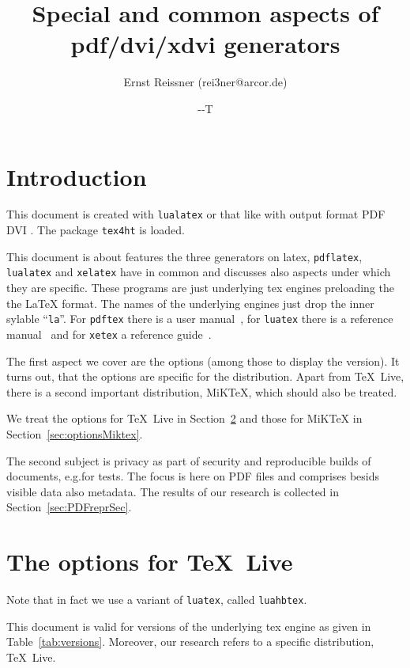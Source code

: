 \documentclass[a4paper, english]{article}%
\title{Special and common aspects of pdf/dvi/xdvi generators }
\author{Ernst Reissner (rei3ner@arcor.de)}
\date{\the\year-\the\month-\the\day T\printtime}%
\newcommand{\pdflatex}{\texttt{pdflatex}}
\newcommand{\lualatex}{\texttt{lualatex}}
\newcommand{\xelatex}{\texttt{xelatex}}
\newcommand{\texlive}{\TeX~Live}
\newcommand{\miktex}{MiKTeX}
\begin{document}
\maketitle
\tableofcontents
\listoftables
\lstlistoflistings%

\section{Introduction}

This document is created with \lualatex{} or that like 
with output format 
\ifpdf%
PDF%
\else
DVI%
\fi.
The package \texttt{tex4ht} 
is  loaded. 

This document is about features the three generators on latex, 
\pdflatex, \lualatex{} and \xelatex{} have in common 
and discusses also aspects under which they are specific. 
These programs are just underlying tex engines preloading the the \LaTeX{} format. 
The names of the underlying engines just drop the inner sylable ``\texttt{la}''. 
For \texttt{pdftex} there is a user manual~\cite{PdfTexUsr24}, 
for \texttt{luatex} there is a reference manual~\cite{LuaTexRef24} and 
for \texttt{xetex} a reference guide~\cite{XeTexRef24}. 

The first aspect we cover are the options (among those to display the version). 
It turns out, that the options are specific for the distribution. 
Apart from \texlive{}, there is a second important distribution, \miktex, 
which should also be treated. 

We treat the options for \texlive{} in Section~\ref{sec:optionsTexlive} 
and those for \miktex{} in Section~\ref{sec:optionsMiktex}. 

The second subject is privacy as part of security 
and reproducible builds of documents, e.g.\@ for tests. 
The focus is here on PDF files and comprises besids visible data 
also metadata. 
The results of our research is collected in Section~\ref{sec:PDFreprSec}. 

\section{The options for \texlive}\label{sec:optionsTexlive}


Note that in fact we use a variant of \texttt{luatex}, called \texttt{luahbtex}. 

This document is valid for versions of the underlying tex engine 
as given in Table~\ref{tab:versions}. 
Moreover, our research refers to a specific distribution, \texlive. 
\end{document}
